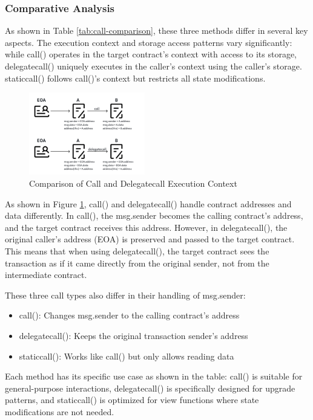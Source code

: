 \documentclass[conference]{IEEEtran}
\begin{document}
\subsubsection{Comparative Analysis}
As shown in Table \ref{tab:call-comparison}, these three methods differ in several key aspects. The execution context and storage access patterns vary significantly: while call() operates in the target contract's context with access to its storage, delegatecall() uniquely executes in the caller's context using the caller's storage. staticcall() follows call()'s context but restricts all state modifications.

\begin{figure}[htbp]
    \centering
    \includegraphics[width=0.45\textwidth]{callVsDelegate.pdf}
    \caption{Comparison of Call and Delegatecall Execution Context}
    \label{fig:call-delegate}
\end{figure}

As shown in Figure \ref{fig:call-delegate}, call() and delegatecall() handle contract addresses and data differently. In call(), the msg.sender becomes the calling contract's address, and the target contract receives this address. However, in delegatecall(), the original caller's address (EOA) is preserved and passed to the target contract. This means that when using delegatecall(), the target contract sees the transaction as if it came directly from the original sender, not from the intermediate contract.

These three call types also differ in their handling of msg.sender:
\begin{itemize}
    \item call(): Changes msg.sender to the calling contract's address
    \item delegatecall(): Keeps the original transaction sender's address
    \item staticcall(): Works like call() but only allows reading data
\end{itemize}

Each method has its specific use case as shown in the table: call() is suitable for general-purpose interactions, delegatecall() is specifically designed for upgrade patterns, and staticcall() is optimized for view functions where state modifications are not needed.
\end{document}
